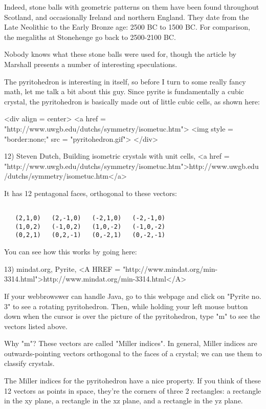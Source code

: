 Indeed, stone balls with geometric patterns on them have been found 
throughout Scotland, and occasionally Ireland and northern England.  
They date from the Late Neolithic to the Early Bronze age: 2500 BC to 
1500 BC.  For comparison, the megaliths at Stonehenge go back to
2500-2100 BC.  

Nobody knows what these stone balls were used for, though the article
by Marshall presents a number of interesting speculations.

The pyritohedron is interesting in itself, so before I turn to some
really fancy math, let me talk a bit about this guy.  Since pyrite is 
fundamentally a cubic crystal, the pyritohedron is basically made out 
of little cubic cells, as shown here:

<div align = center>
<a href = "http://www.uwgb.edu/dutchs/symmetry/isometuc.htm">
<img style = "border:none;" src = "pyritohedron.gif">
</div>

12) Steven Dutch, Building isometric crystals with unit cells, 
<a href = "http://www.uwgb.edu/dutchs/symmetry/isometuc.htm">http://www.uwgb.edu/dutchs/symmetry/isometuc.htm</a>

It has 12 pentagonal faces, orthogonal to these vectors:


\begin{verbatim}

   (2,1,0)   (2,-1,0)   (-2,1,0)   (-2,-1,0)
   (1,0,2)   (-1,0,2)   (1,0,-2)   (-1,0,-2)
   (0,2,1)   (0,2,-1)   (0,-2,1)   (0,-2,-1)
\end{verbatim}
    

You can see how this works by going here:

13) mindat.org, Pyrite, <A HREF = "http://www.mindat.org/min-3314.html">http://www.mindat.org/min-3314.html</A>

If your webbrowswer can handle Java, go to this webpage and click on
"Pyrite no. 3" to see a rotating pyritohedron.  Then, while
holding your left mouse button down when the cursor is over the
picture of the pyritohedron, type "m" to see the vectors
listed above.

Why "m"?  These vectors are called "Miller
indices".  In general, Miller indices are
outwards-pointing vectors orthogonal to the faces of a crystal; we can
use them to classify crystals.

The Miller indices for the pyritohedron have a nice property.  If you
think of these 12 vectors as points in space, they're the corners of
three 2 rectangles: a rectangle in the xy plane, a rectangle in the
xz plane, and a rectangle in the yz plane.  

